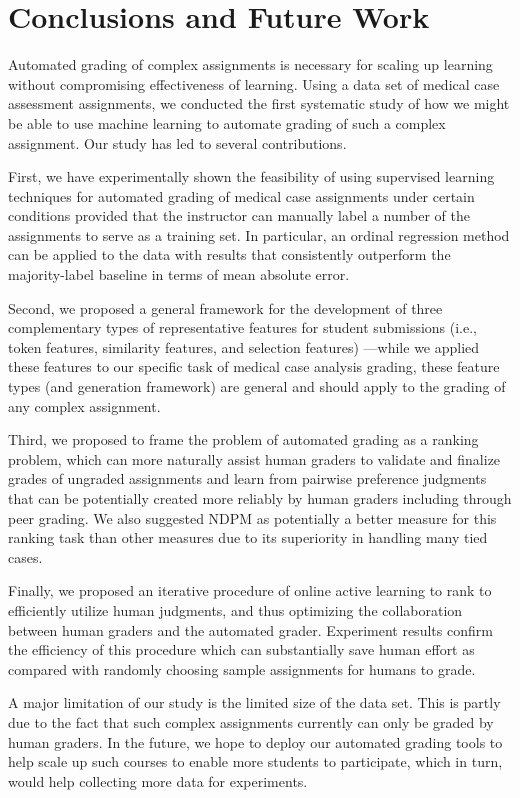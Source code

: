 \section{Conclusions and Future Work}

Automated grading of complex assignments is necessary for scaling up learning without compromising 
effectiveness of learning. Using a data set of medical case assessment assignments, 
 we conducted the first systematic study of how we might be able to use machine learning to automate grading
of such a complex assignment. Our study has led to several contributions. 

First, we have experimentally shown the feasibility of using
supervised learning techniques for automated grading of medical case assignments under certain conditions
provided that the instructor can manually label a number of the
assignments to serve as a training set. In particular,  an ordinal regression
method can be applied to the data with results that consistently outperform
the majority-label baseline in terms of mean absolute error.

Second, we proposed a general framework for the development of three complementary types of 
representative
features for student submissions (i.e., token features, similarity features, and selection features) ---while we applied these features to our
specific task of medical case analysis grading, these feature types (and
generation framework) are general and should apply to the grading of any
complex assignment.

Third, we proposed to frame the problem of automated grading as a ranking 
problem, which can more naturally assist human graders to validate
and finalize grades of ungraded assignments and learn from pairwise
preference judgments that can be potentially created more reliably by human
graders including through peer grading. We also suggested
NDPM as potentially a better measure for this ranking task than other measures due to its superiority in handling many tied cases. 

Finally, we proposed an iterative procedure of online active learning to rank to efficiently
utilize human judgments, and thus optimizing the collaboration between human graders and
  the automated grader. Experiment results confirm the efficiency of this procedure
which can substantially save human effort as compared with randomly choosing
sample assignments for humans to grade. 

A major limitation of our study is the limited size of the data set. 
This is partly due to the fact that such complex assignments currently can only be graded
by human graders. In the future, we hope to deploy our automated grading tools
to help scale up such courses to enable more students to participate, which in turn, would
help collecting more data for experiments. 

